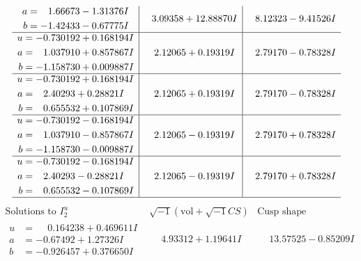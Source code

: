 \documentclass[1p]{elsarticle_modified}
\theoremstyle{definition}
\newcommand{\I}{\sqrt{-1}}
\begin{document}
$$\begin{array}{c|c|c}
\begin{aligned}
a &= \phantom{-}1.66673 - 1.31376 I \\
b &= -1.42433 - 0.67775 I\end{aligned}
 & \phantom{-}3.09358 + 12.88870 I & \phantom{-}8.12323 - 9.41526 I \\ \hline\begin{aligned}
u &= -0.730192 + 0.168194 I \\
a &= \phantom{-}1.037910 + 0.857867 I \\
b &= -1.158730 + 0.009887 I\end{aligned}
 & \phantom{-}2.12065 + 0.19319 I & \phantom{-}2.79170 - 0.78328 I \\ \hline\begin{aligned}
u &= -0.730192 + 0.168194 I \\
a &= \phantom{-}2.40293 + 0.28821 I \\
b &= \phantom{-}0.655532 + 0.107869 I\end{aligned}
 & \phantom{-}2.12065 + 0.19319 I & \phantom{-}2.79170 - 0.78328 I \\ \hline\begin{aligned}
u &= -0.730192 - 0.168194 I \\
a &= \phantom{-}1.037910 - 0.857867 I \\
b &= -1.158730 - 0.009887 I\end{aligned}
 & \phantom{-}2.12065 - 0.19319 I & \phantom{-}2.79170 + 0.78328 I \\ \hline\begin{aligned}
u &= -0.730192 - 0.168194 I \\
a &= \phantom{-}2.40293 - 0.28821 I \\
b &= \phantom{-}0.655532 - 0.107869 I\end{aligned}
 & \phantom{-}2.12065 - 0.19319 I & \phantom{-}2.79170 + 0.78328 I\\
 \hline 
 \end{array}$$\newpage$$\begin{array}{c|c|c}  
\text{Solutions to }I^u_{2}& \I (\text{vol} + \sqrt{-1}CS) & \text{Cusp shape}\\
 \hline 
\begin{aligned}
u &= \phantom{-}0.164238 + 0.469611 I \\
a &= -0.67492 + 1.27326 I \\
b &= -0.926457 + 0.376650 I\end{aligned}
 & \phantom{-}4.93312 + 1.19641 I & \phantom{-}13.57525 - 0.85209 I \\ \hline\begin{aligned}

\end{aligned}
\end{array}$$
\end{document}
